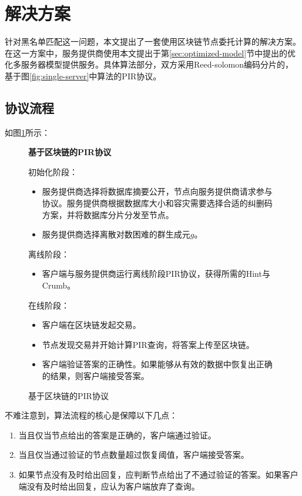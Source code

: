 \section{解决方案}
针对黑名单匹配这一问题，本文提出了一套使用区块链节点委托计算的解决方案。在这一方案中，服务提供商使用本文提出于第\ref{sec:optimized-model}节中提出的优化多服务器模型提供服务。具体算法部分，双方采用Reed-solomon编码分片的，基于图\ref{fig:single-server}中算法的PIR协议。
\subsection{协议流程}
如图\ref{fig:blockchain-scheme}所示：
\begin{figure}
    \begin{mdframed}
        \centering
        \textbf{基于区块链的PIR协议}

        \raggedright
        初始化阶段：
        \begin{itemize}
            \item 服务提供商选择将数据库摘要公开，节点向服务提供商请求参与协议。服务提供商根据数据库大小和容灾需要选择合适的纠删码方案，并将数据库分片分发至节点。
            \item 服务提供商选择离散对数困难的群生成元$g$。
        \end{itemize}
        离线阶段：
        \begin{itemize}
            \item 客户端与服务提供商运行离线阶段PIR协议，获得所需的Hint与Crumb。
        \end{itemize}
        在线阶段：
        \begin{itemize}
            \item 客户端在区块链发起交易。
            \item 节点发现交易并开始计算PIR查询，将答案上传至区块链。
            \item 客户端验证答案的正确性。如果能够从有效的数据中恢复出正确的结果，则客户端接受答案。
        \end{itemize}
    \end{mdframed}
    \caption{基于区块链的PIR协议}
    \label{fig:blockchain-scheme}
\end{figure}

不难注意到，算法流程的核心是保障以下几点：
\begin{enumerate}
    \item 当且仅当节点给出的答案是正确的，客户端通过验证。
    \item 当且仅当通过验证的节点数量超过恢复阈值，客户端接受答案。
    \item 如果节点没有及时给出回复，应判断节点给出了不通过验证的答案。如果客户端没有及时给出回复，应认为客户端放弃了查询。
\end{enumerate}

